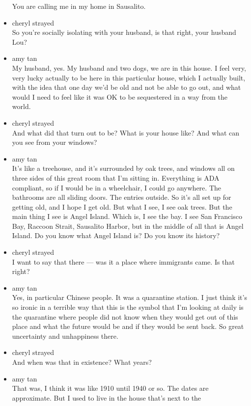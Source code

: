 \begin{itemize}
  You are calling me in my home in Sausalito.
\item
  cheryl strayed\\
  So you're socially isolating with your husband, is that right, your
  husband Lou?
\item
  amy tan\\
  My husband, yes. My husband and two dogs, we are in this house. I feel
  very, very lucky actually to be here in this particular house, which I
  actually built, with the idea that one day we'd be old and not be able
  to go out, and what would I need to feel like it was OK to be
  sequestered in a way from the world.
\item
  cheryl strayed\\
  And what did that turn out to be? What is your house like? And what
  can you see from your windows?
\item
  amy tan\\
  It's like a treehouse, and it's surrounded by oak trees, and windows
  all on three sides of this great room that I'm sitting in. Everything
  is ADA compliant, so if I would be in a wheelchair, I could go
  anywhere. The bathrooms are all sliding doors. The entries outside. So
  it's all set up for getting old, and I hope I get old. But what I see,
  I see oak trees. But the main thing I see is Angel Island. Which is, I
  see the bay. I see San Francisco Bay, Raccoon Strait, Sausalito
  Harbor, but in the middle of all that is Angel Island. Do you know
  what Angel Island is? Do you know its history?
\item
  cheryl strayed\\
  I want to say that there --- was it a place where immigrants came. Is
  that right?
\item
  amy tan\\
  Yes, in particular Chinese people. It was a quarantine station. I just
  think it's so ironic in a terrible way that this is the symbol that
  I'm looking at daily is the quarantine where people did not know when
  they would get out of this place and what the future would be and if
  they would be sent back. So great uncertainty and unhappiness there.
\item
  cheryl strayed\\
  And when was that in existence? What years?
\item
  amy tan\\
  That was, I think it was like 1910 until 1940 or so. The dates are
  approximate. But I used to live in the house that's next to the

\end{itemize}

